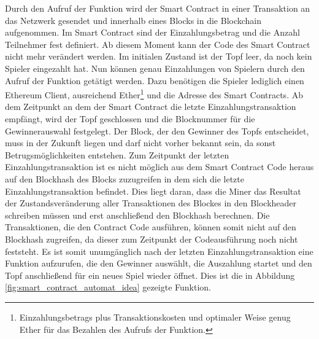 Durch den Aufruf der  Funktion wird der Smart Contract in einer Transaktion an das Netzwerk gesendet und innerhalb eines Blocks in die Blockchain aufgenommen. Im Smart Contract sind der Einzahlungsbetrag und die Anzahl Teilnehmer  fest definiert. Ab diesem Moment kann der Code des Smart Contract nicht mehr verändert werden. Im initialen Zustand ist der Topf leer, da noch kein Spieler eingezahlt hat. Nun können genau  Einzahlungen von Spielern durch den Aufruf der  Funktion getätigt werden. Dazu benötigen die Spieler lediglich einen Ethereum Client, ausreichend Ether\footnote{Einzahlungsbetrags plus Transaktionskosten und optimaler Weise genug Ether für das Bezahlen des Aufrufs der  Funktion.} und die Adresse des Smart Contracts. Ab dem Zeitpunkt an dem der Smart Contract die letzte Einzahlungstransaktion empfängt, wird der Topf geschlossen und die Blocknummer für die Gewinnerauswahl festgelegt. Der Block, der den Gewinner des Topfs entscheidet, muss in der Zukunft liegen und darf nicht vorher bekannt sein, da sonst Betrugsmöglichkeiten entstehen. Zum Zeitpunkt der letzten Einzahlungstransaktion ist es nicht möglich aus dem Smart Contract Code heraus auf den Blockhash des Blocks zuzugreifen in dem sich die letzte Einzahlungstransaktion befindet. Dies liegt daran, dass die Miner das Resultat der Zustandsveränderung aller Transaktionen des Blockes in den Blockheader schreiben müssen und erst anschließend den Blockhash berechnen. Die Transaktionen, die den Contract Code ausführen, können somit nicht auf den Blockhash zugreifen, da dieser zum Zeitpunkt der Codeausführung noch nicht feststeht. Es ist somit unumgänglich nach der letzten Einzahlungstransaktion eine Funktion aufzurufen, die den Gewinner auswählt, die Auszahlung startet und den Topf anschließend für ein neues Spiel wieder öffnet. Dies ist die in Abbildung \ref{fig:smart_contract_automat_idea} gezeigte  Funktion.
